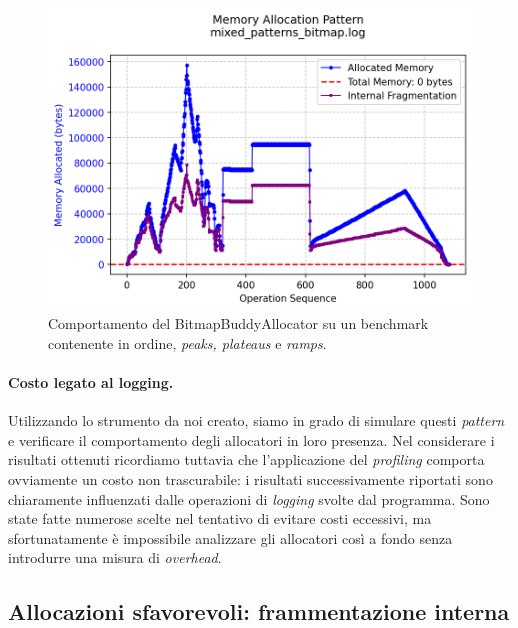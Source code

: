 \begin{figure}[H]
  \centering
  \includegraphics[width=1\textwidth]{graphs/mixed_patterns_bitmap.png}
  \caption{Comportamento del BitmapBuddyAllocator su un benchmark contenente in ordine, \textit{peaks, plateaus} e \textit{ramps}.}
  \label{fig:mixed_patterns_bitmap}
\end{figure}

\paragraph{Costo legato al logging.}
Utilizzando lo strumento da noi creato, siamo in grado di simulare questi \textit{pattern} e verificare il comportamento degli allocatori in loro presenza. Nel considerare i risultati ottenuti ricordiamo tuttavia che l'applicazione del \textit{profiling} comporta ovviamente un costo non trascurabile: i risultati successivamente riportati sono chiaramente influenzati dalle operazioni di \textit{logging} svolte dal programma. Sono state fatte numerose scelte nel tentativo di evitare costi eccessivi, ma sfortunatamente è impossibile analizzare gli allocatori così a fondo senza introdurre una misura di \textit{overhead}.

\subsection{Allocazioni sfavorevoli: frammentazione interna}

